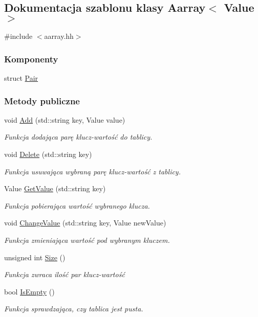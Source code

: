 \hypertarget{class_aarray}{\subsection{Dokumentacja szablonu klasy Aarray$<$ Value $>$}
\label{class_aarray}
}


{\ttfamily \#include $<$aarray.\-hh$>$}

\subsubsection*{Komponenty}
\begin{DoxyCompactItemize}
\item 
struct \hyperlink{struct_aarray_1_1_pair}{Pair}
\end{DoxyCompactItemize}
\subsubsection*{Metody publiczne}
\begin{DoxyCompactItemize}
\item 
void \hyperlink{class_aarray_a5afb6c54011404e2695d4072bd4fd8aa}{Add} (std\-::string key, Value value)
\begin{DoxyCompactList}\small\item\em Funkcja dodająca parę klucz-\/wartość do tablicy. \end{DoxyCompactList}\item 
void \hyperlink{class_aarray_a4406f808014ebe6eeb252665d5b073e5}{Delete} (std\-::string key)
\begin{DoxyCompactList}\small\item\em Funkcja usuwająca wybraną parę klucz-\/wartość z tablicy. \end{DoxyCompactList}\item 
Value \hyperlink{class_aarray_a4e5974b11d28d3fe057c603fa11a8d7e}{Get\-Value} (std\-::string key)
\begin{DoxyCompactList}\small\item\em Funkcja pobierająca wartość wybranego klucza. \end{DoxyCompactList}\item 
void \hyperlink{class_aarray_acc1f480867b542c47fc1dc5be8d8b3e9}{Change\-Value} (std\-::string key, Value new\-Value)
\begin{DoxyCompactList}\small\item\em Funkcja zmieniająca wartość pod wybranym kluczem. \end{DoxyCompactList}\item 
unsigned int \hyperlink{class_aarray_ab464f407ff70721e4fd5f075ddcf16a9}{Size} ()
\begin{DoxyCompactList}\small\item\em Funkcja zwraca ilość par klucz-\/wartość \end{DoxyCompactList}\item 
bool \hyperlink{class_aarray_ae9ea529b2bbbdba807cf1bd01e896c27}{Is\-Empty} ()
\begin{DoxyCompactList}\small\item\em Funkcja sprawdzająca, czy tablica jest pusta. \end{DoxyCompactList}\end{DoxyCompactItemize}
